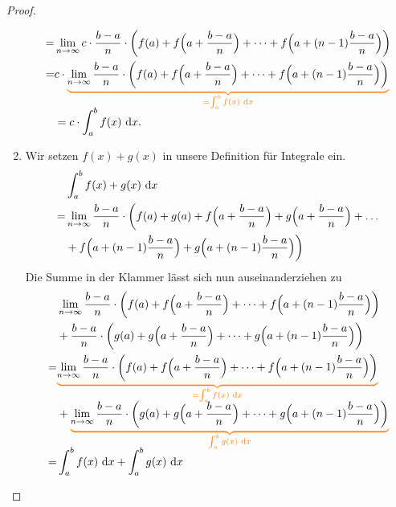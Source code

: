 \documentclass[../../main.tex]{subfiles}
\begin{document}
\begin{proof}
\begin{enumerate}
\begin{align*}
            =&\lim_{n\rightarrow\infty}c\cdot\frac{b-a}{n}\cdot \biggl(f(a)+f\Bigl(a+\frac{b-a}{n}\Bigr)+\dots+f\Bigl(a+(n-1)\frac{b-a}{n}\Bigr)\biggr)\\
            =&c\cdot \colorbrace{\lim_{n\rightarrow\infty}\frac{b-a}{n}\cdot \biggl(f(a)+f\Bigl(a+\frac{b-a}{n}\Bigr)+\dots+f\Bigl(a+(n-1)\frac{b-a}{n}\Bigr)\biggr)}{=\int_a^bf(x)\diff x}\\
            &=c\cdot \int_a^bf(x)\diff x.
        \end{align*}
        \item Wir setzen $f(x)+g(x)$ in unsere Definition für Integrale ein.
        \begin{align*}
            &\int_a^bf(x)+g(x)\mathop{}\mathrm{d} x\\
            =&\lim_{n\rightarrow\infty}\frac{b-a}{n}\cdot \biggl(f(a)+g(a)+f\Bigl(a+\frac{b-a}{n}\Bigr)+g\Bigl(a+\frac{b-a}{n}\Bigr)+\dots\\
            &+f\Bigl(a+(n-1)\frac{b-a}{n}\Bigr)+g\Bigl(a+(n-1)\frac{b-a}{n}\Bigr)\biggr)\\
        \end{align*}
        Die Summe in der Klammer lässt sich nun auseinanderziehen zu
        \begin{align*}
            &\lim_{n\rightarrow\infty}\frac{b-a}{n}\cdot \biggl(f(a)+f\Bigl(a+\frac{b-a}{n}\Bigr)+\dots+f\Bigl(a+(n-1)\frac{b-a}{n}\Bigr)\biggr)\\
            &+\frac{b-a}{n}\cdot \biggl(g(a)+g\Bigl(a+\frac{b-a}{n}\Bigr)+\dots+g\Bigl(a+(n-1)\frac{b-a}{n}\Bigr)\biggr)\\
            =&\colorbrace{\lim_{n\rightarrow\infty}\frac{b-a}{n}\cdot \biggl(f(a)+f\Bigl(a+\frac{b-a}{n}\Bigr)+\dots+f\Bigl(a+(n-1)\frac{b-a}{n}\Bigr)\biggr)}{=\int_a^bf(x)\diff x}\\
            &+\colorbrace{\lim_{n\rightarrow\infty}\frac{b-a}{n}\cdot \biggl(g(a)+g\Bigl(a+\frac{b-a}{n}\Bigr)+\dots+g\Bigl(a+(n-1)\frac{b-a}{n}\Bigr)\biggr)}{\int_a^bg(x)\diff x}\\
            =&\int_a^bf(x)\diff x+\int_a^bg(x)\diff x\qedhere
        \end{align*}
    \end{enumerate}
\end{proof}
\end{document}
